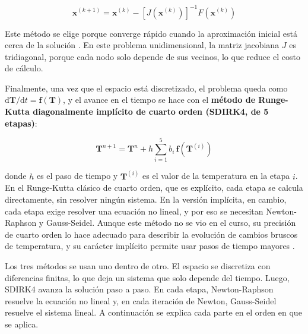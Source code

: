\documentclass[final,5p,times,twocolumn,authoryear,11pt]{elsarticle}
\begin{document}
\begin{equation}
\mathbf{x}^{(k+1)} = \mathbf{x}^{(k)} - \left[ J\!\left(\mathbf{x}^{(k)}\right) \right]^{-1} F\!\left(\mathbf{x}^{(k)}\right)
\label{eq:newton_raphson}
\end{equation}

\noindent Este método se elige porque converge rápido cuando la aproximación inicial está cerca de la solución \citep{Deuflhard1974}. En este problema unidimensional, la matriz jacobiana $J$ es tridiagonal, porque cada nodo solo depende de sus vecinos, lo que reduce el costo de cálculo.

Finalmente, una vez que el espacio está discretizado, el problema queda como $\mathrm{d}\mathbf{T}/\mathrm{d}t=\mathbf{f}(\mathbf{T})$, y el avance en el tiempo se hace con el \textbf{método de Runge-Kutta diagonalmente implícito de cuarto orden (SDIRK4, de 5 etapas)}:

\begin{equation}
\mathbf{T}^{n+1} = \mathbf{T}^{n} + h\sum_{i=1}^{5} b_i\,\mathbf{f}(\mathbf{T}^{(i)})
\label{eq:sdirk}
\end{equation}

\noindent donde $h$ es el paso de tiempo y $\mathbf{T}^{(i)}$ es el valor de la temperatura en la etapa $i$. En el Runge-Kutta clásico de cuarto orden, que es explícito, cada etapa se calcula directamente, sin resolver ningún sistema. En la versión implícita, en cambio, cada etapa exige resolver una ecuación no lineal, y por eso se necesitan Newton-Raphson y Gauss-Seidel. Aunque este método no se vio en el curso, su precisión de cuarto orden lo hace adecuado para describir la evolución de cambios bruscos de temperatura, y su carácter implícito permite usar pasos de tiempo mayores \citep{Wang2015, Deng2014, Levy2022}.


Los tres métodos se usan uno dentro de otro. El espacio se discretiza con diferencias finitas, lo que deja un sistema que solo depende del tiempo. Luego, SDIRK4 avanza la solución paso a paso. En cada etapa, Newton-Raphson resuelve la ecuación no lineal y, en cada iteración de Newton, Gauss-Seidel resuelve el sistema lineal. A continuación se explica cada parte en el orden en que se aplica.
\end{document}
